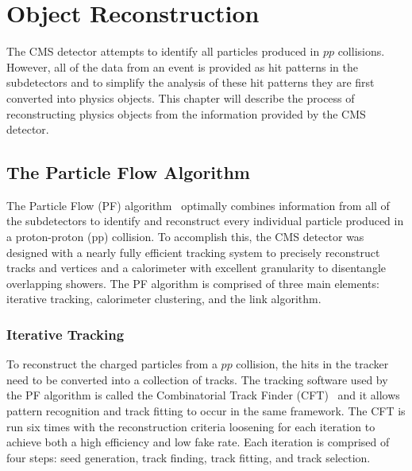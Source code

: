 \chapter{Object Reconstruction}
\label{ch:ObjReco}

The CMS detector attempts to identify all particles produced in $pp$ collisions. However, all of the data from an event is provided as hit patterns in the subdetectors and to simplify the analysis of these hit patterns they are first converted into physics objects. This chapter will describe the process of reconstructing physics objects from the information provided by the CMS detector.


\section{The Particle Flow Algorithm}

The Particle Flow (PF) algorithm~\cite{PFAlgorithm, PFReconstruction} optimally combines information from all of the subdetectors to identify and reconstruct every individual particle produced in a proton-proton (pp) collision. To accomplish this, the CMS detector was designed with a nearly fully efficient tracking system to precisely reconstruct tracks and vertices and a calorimeter with excellent granularity to disentangle overlapping showers. The PF algorithm is comprised of three main elements: iterative tracking, calorimeter clustering, and the link algorithm.

\subsection{Iterative Tracking}

To reconstruct the charged particles from a $pp$ collision, the hits in the tracker need to be converted into a collection of tracks. The tracking software used by the PF algorithm is called the Combinatorial Track Finder (CFT)~\cite{TrackReco} and it allows pattern recognition and track fitting to occur in the same framework. The CFT is run six times with the reconstruction criteria loosening for each iteration to achieve both a high efficiency and low fake rate. Each iteration is comprised of four steps: seed generation, track finding, track fitting, and track selection.

